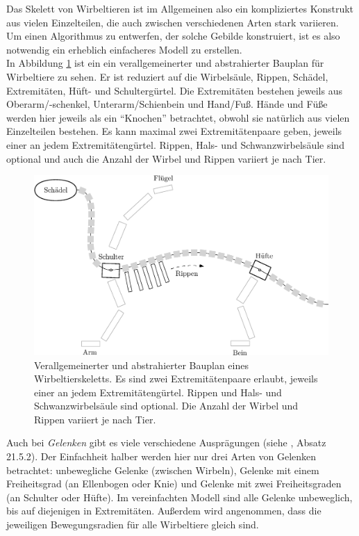 Das Skelett von Wirbeltieren ist im Allgemeinen also ein kompliziertes Konstrukt aus vielen Einzelteilen, die auch zwischen verschiedenen Arten stark variieren. Um einen Algorithmus zu entwerfen, der solche Gebilde konstruiert, ist es also notwendig ein erheblich einfacheres Modell zu erstellen.\\ 
In Abbildung \ref{bauplan_skelett} ist ein ein verallgemeinerter und abstrahierter Bauplan für Wirbeltiere zu sehen. Er ist reduziert auf die Wirbelsäule, Rippen, Schädel, Extremitäten, Hüft- und Schultergürtel. Die Extremitäten bestehen jeweils aus Oberarm/-schenkel, Unterarm/Schienbein und Hand/Fuß. Hände und Füße werden hier jeweils als ein "`Knochen"' betrachtet, obwohl sie natürlich aus vielen Einzelteilen bestehen. Es kann maximal zwei Extremitätenpaare geben, jeweils einer an jedem Extremitätengürtel. Rippen, Hals- und Schwanzwirbelsäule sind optional und auch die Anzahl der Wirbel und Rippen variiert je nach Tier.

\begin{figure}
 \centering
 \includegraphics[width=\textwidth]{graphics/skeletonPlan}
 \caption{Verallgemeinerter und abstrahierter Bauplan eines Wirbeltierskeletts. Es sind zwei Extremitätenpaare erlaubt, jeweils einer an jedem Extremitätengürtel. Rippen und Hals- und Schwanzwirbelsäule sind optional. Die Anzahl der Wirbel und Rippen variiert je nach Tier.}
 \label{bauplan_skelett}
\end{figure}


Auch bei \emph{Gelenken} gibt es viele verschiedene Ausprägungen (siehe \cite{Vergleichende_Anatomie}, Absatz 21.5.2). Der Einfachheit halber werden hier nur drei Arten von Gelenken betrachtet: unbewegliche Gelenke (\zb zwischen Wirbeln), Gelenke mit einem Freiheitsgrad (\zb an Ellenbogen oder Knie) und Gelenke mit zwei Freiheitsgraden (\zb an Schulter oder Hüfte).
Im vereinfachten Modell sind alle Gelenke unbeweglich, bis auf diejenigen in Extremitäten. Außerdem wird angenommen, dass die jeweiligen Bewegungsradien für alle Wirbeltiere gleich sind. 

